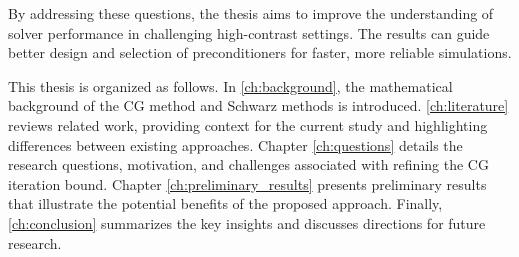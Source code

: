 By addressing these questions, the thesis aims to improve the understanding of solver performance in challenging high-contrast settings. The results can guide better design and selection of preconditioners for faster, more reliable simulations.

This thesis is organized as follows. In \cref{ch:background}, the mathematical background of the CG method and Schwarz methods is introduced. \cref{ch:literature} reviews related work, providing context for the current study and highlighting differences between existing approaches. Chapter \ref{ch:questions} details the research questions, motivation, and challenges associated with refining the CG iteration bound. Chapter \ref{ch:preliminary_results} presents preliminary results that illustrate the potential benefits of the proposed approach. Finally, \cref{ch:conclusion} summarizes the key insights and discusses directions for future research.